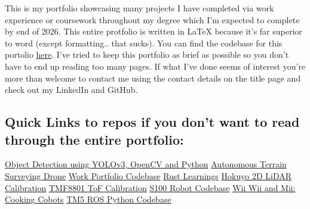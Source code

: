 This is my portfolio showcasing many projects I have completed via work experience or coursework throughout my degree which I'm expected to complete by end of 2026. 
This entire protfolio is written in LaTeX because it's far superior to word (except formatting.. that sucks). You can find the codebase for this 
portolio \href{https://github.com/jackfruittt/Work_Portfolio}{here}. I've tried to keep this portfolio as brief as possible so you don't have to end 
up reading too many pages. If what I've done seems of interest you're more than welcome to contact me using the contact details on the title page and 
check out my LinkedIn and GitHub. \newline

\subsection{Quick Links to repos if you don't want to read through the entire portfolio: } 
\href{https://github.com/jackfruittt/simple-object-detection}{Object Detection using YOLOv3, OpenCV and Python} \newline
\href{https://github.com/jackfruittt/Terrain-Surveying-Drone}{Autonomous Terrain Surveying Drone} \newline
\href{https://github.com/jackfruittt/Work_Portfolio}{Work Portfolio Codebase} \newline
\href{https://github.com/jackfruittt/rust_learnings}{Rust Learnings} \newline
\href{https://github.com/jackfruittt/Hokuyo_Calibration}{Hokuyo 2D LiDAR Calibration} \newline
\href{https://github.com/jackfruittt/tmf8801_Calibration}{TMF8801 ToF Calibration} \newline
\href{https://github.com/jackfruittt/S100_Interface}{S100 Robot Codebase} \newline
\href{https://github.com/jackfruittt/Industrial_Robotics_A2}{Wii Wii and Mii: Cooking Cobots} \newline
\href{https://github.com/jackfruittt/tm5_ros_python}{TM5 ROS Python Codebase} \newline
\newpage